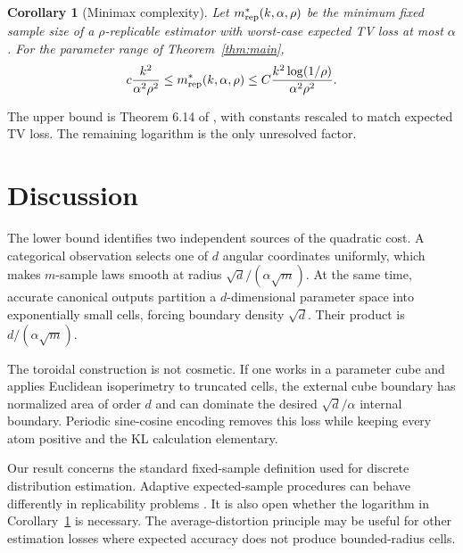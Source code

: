 \documentclass[twoside]{article}
\newtheorem{corollary}[theorem]{Corollary}
\theoremstyle{definition}
\newcommand{\1}{\mathbf 1}
\begin{document}
\begin{corollary}[Minimax complexity]\label{cor:minimax}
Let $m^*_{\rm rep}(k,\alpha,\rho)$ be the minimum fixed sample size of a $\rho$-replicable estimator with worst-case expected TV loss at most $\alpha$. For the parameter range of Theorem~\ref{thm:main}, \[ c\frac{k^2}{\alpha^2\rho^2} \le m^*_{\rm rep}(k,\alpha,\rho) \le C\frac{k^2\log(1/\rho)}{\alpha^2\rho^2}. \]
\end{corollary}

The upper bound is Theorem 6.14 of \citet{bun2023}, with constants rescaled to match expected TV loss. The remaining logarithm is the only unresolved factor.

\section{Discussion}

The lower bound identifies two independent sources of the quadratic cost. A categorical observation selects one of $d$ angular coordinates uniformly, which makes $m$-sample laws smooth at radius $\sqrt d/(\alpha\sqrt m)$. At the same time, accurate canonical outputs partition a $d$-dimensional parameter space into exponentially small cells, forcing boundary density $\sqrt d$. Their product is $d/(\alpha\sqrt m)$.

The toroidal construction is not cosmetic. If one works in a parameter cube and applies Euclidean isoperimetry to truncated cells, the external cube boundary has normalized area of order $d$ and can dominate the desired $\sqrt d/\alpha$ internal boundary. Periodic sine-cosine encoding removes this loss while keeping every atom positive and the KL calculation elementary.

Our result concerns the standard fixed-sample definition used for discrete distribution estimation. Adaptive expected-sample procedures can behave differently in replicability problems \citep{hopkins2024}. It is also open whether the logarithm in Corollary~\ref{cor:minimax} is necessary. The average-distortion principle may be useful for other estimation losses where expected accuracy does not produce bounded-radius cells.



\appendix

\end{document}
